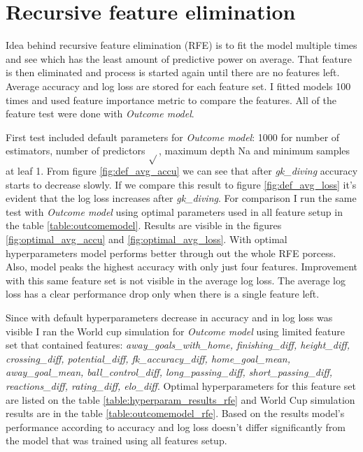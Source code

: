\section{Recursive feature elimination}
Idea behind recursive feature elimination (RFE) is to fit the model multiple times and see which has the least amount of predictive power on average. That feature is then eliminated and process is started again until there are no features left. Average accuracy and log loss are stored for each feature set. I fitted models 100 times and used feature importance metric to compare the features. All of the feature test were done with \textit{Outcome model}.

First test included default parameters for \textit{Outcome model}: 1000 for number of estimators, number of predictors $\sqrt{}$, maximum depth Na and minimum samples at leaf 1. From figure \ref{fig:def_avg_accu} we can see that after \textit{gk\_diving} accuracy starts to decrease slowly. If we compare this result to figure \ref{fig:def_avg_loss}
it's evident that the log loss increases after \textit{gk\_diving}. For comparison I run the same test with \textit{Outcome model} using optimal parameters used in all feature setup in the table \ref{table:outcomemodel}. Results are visible in the figures \ref{fig:optimal_avg_accu} and \ref{fig:optimal_avg_loss}. With optimal hyperparameters model performs better through out the whole RFE porcess. Also, model peaks the highest accuracy with only just four features. Improvement with this same feature set is not visible in the average log loss. The average log loss has a clear performance drop only when there is a single feature left.

Since with default hyperparameters decrease in accuracy and in log loss was visible I ran the World cup simulation for \textit{Outcome model} using limited feature set that contained features: \textit{away\_goals\_with\_home, finishing\_diff, height\_diff, crossing\_diff, potential\_diff, fk\_accuracy\_diff, home\_goal\_mean, away\_goal\_mean, ball\_control\_diff, long\_passing\_diff,  short\_passing\_diff, reactions\_diff, rating\_diff, elo\_diff}. Optimal hyperparameters for this feature set are listed on the table \ref{table:hyperparam_results_rfe} and World Cup simulation results are in the table \ref{table:outcomemodel_rfe}. Based on the results model's performance according to accuracy and log loss doesn't differ significantly from the model that was trained using all features setup.

